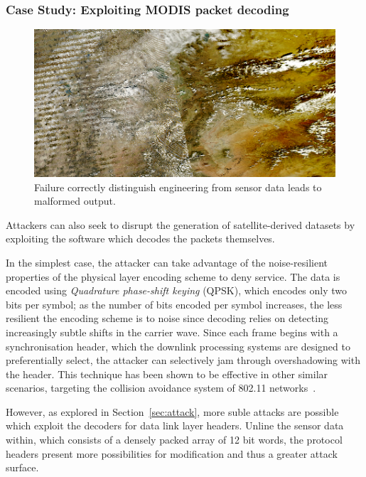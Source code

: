 
\subsubsection{Case Study: Exploiting MODIS packet decoding}

\begin{figure}
    \includegraphics[width=\columnwidth]{diagrams/interleave.png}
    \caption{Failure correctly distinguish engineering from sensor data leads to malformed output.}
    \label{fig:interleave}
\end{figure}

Attackers can also seek to disrupt the generation of satellite-derived datasets by exploiting the software which decodes the packets themselves.

In the simplest case, the attacker can take advantage of the noise-resilient properties of the physical layer encoding scheme to deny service.
The data is encoded using \textit{Quadrature phase-shift keying} (QPSK), which encodes only two bits per symbol; as the number of bits encoded per symbol increases, the less resilient the encoding scheme is to noise since decoding relies on detecting increasingly subtle shifts in the carrier wave.
Since each frame begins with a synchronisation header, which the downlink processing systems are designed to preferentially select, the attacker can selectively jam through overshadowing with the header.
This technique has been shown to be effective in other similar scenarios, targeting the collision avoidance system of 802.11 networks~\cite{gummadi2007understanding}.


However, as explored in Section~\ref{sec:attack}, more suble attacks are possible which exploit the decoders for data link layer headers.
Unline the sensor data within, which consists of a densely packed array of 12 bit words, the protocol headers present more possibilities for modification and thus a greater attack surface.

